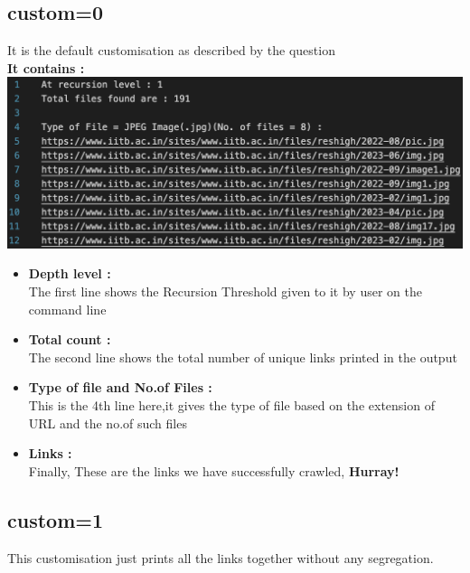 \documentclass{article}
\begin{document}
\subsection{custom=0}
It is the default customisation as described by the question\\[0.3cm]
\textbf{It contains :}\\

 \includegraphics[width=14cm]{output.png}
\begin{itemize}
    \item \textbf{Depth level :}\\[0.4cm]
    The first line shows the Recursion Threshold given to it by user on the command line
    \item \textbf{Total count :}\\[0.4cm]
    The second line shows the total number of unique links printed in the output
    \item \textbf{Type of file and No.of Files :}\\[0.4cm]
    This is the 4th line here,it gives the type of file based on the extension of URL and the no.of such files
    \item \textbf{Links :}\\[0.4cm]
    Finally, These are the links we have successfully crawled, \textbf{Hurray!}\\[1cm]
\end{itemize}
\subsection{custom=1}
This customisation just prints all the links together without any segregation.
\newpage
\end{document}
